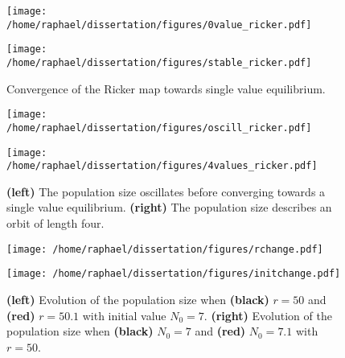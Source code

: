\documentclass[12pt]{article}
\begin{document}
	\begin{figure}[htb]
		\centering
		\begin{minipage}{0.4\textwidth}
			\centering
			\texttt{[image: /home/raphael/dissertation/figures/0value\_ricker.pdf]}
		\end{minipage}
		\begin{minipage}{0.4\textwidth}
			\centering
			\texttt{[image: /home/raphael/dissertation/figures/stable\_ricker.pdf]}
		\end{minipage}
		\caption{Convergence of the Ricker map towards single value equilibrium.}
		\label{fig:stab}
	\end{figure}

	\begin{figure}[htb]
		\centering
		\begin{minipage}{0.4\textwidth}
			\centering
			\texttt{[image: /home/raphael/dissertation/figures/oscill\_ricker.pdf]}
		\end{minipage}
		\begin{minipage}{0.4\textwidth}
			\centering
			\texttt{[image: /home/raphael/dissertation/figures/4values\_ricker.pdf]}
		\end{minipage}
		\caption[Examples of oscillation and orbit of the Ricker map.]{\textbf{(left)} The population size oscillates before converging towards a single value equilibrium. \textbf{(right)} The population size describes an orbit of length four.}
		\label{fig:oscill}
	\end{figure}
	
	\begin{figure}[htb]
		\centering
		\begin{minipage}{0.4\textwidth}
			\centering
			\texttt{[image: /home/raphael/dissertation/figures/rchange.pdf]}
		\end{minipage}
		\begin{minipage}{0.4\textwidth}
			\centering
			\texttt{[image: /home/raphael/dissertation/figures/initchange.pdf]}
		\end{minipage}
		\caption[Examples of the chaotic behaviour of the Ricker map.]{\textbf{(left)} Evolution of the population size when \textbf{(black)} $r=50$ and \textbf{(red)} $r=50.1$ with initial value $N_0=7$. \textbf{(right)} Evolution of the population size when \textbf{(black)} $N_0=7$ and \textbf{(red)} $N_0=7.1$ with $r=50$.}
		\label{fig:chaos}
	\end{figure}
\end{document}
